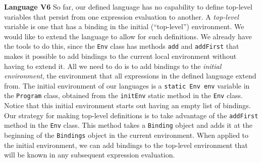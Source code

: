 \begin{minipage}[t]{\sw}
\slidenumber
\LARGE
{\bf Language V6}\exx
So far, our defined language has no capability to define top-level
variables that persist from one expression evaluation to another.
A {\em top-level} variable is one that has a binding
in the initial (``top-level'') environment.
We would like to extend the language to allow for such definitions.\exx
We already have the tools to do this,
since the \verb'Env' class has methods
\verb'add' and \verb'addFirst' that makes it 
possible to add bindings to the current local environment
without having to extend it.
All we need to do is to add bindings
to the {\em initial environment},
the environment that all expressions
in the defined language extend from.\exx
The initial environment of our languages
is a \verb'static Env env' variable
in the \verb'Program' class,
obtained from the \verb'initEnv' static method
in the \verb'Env' class.
Notice that this initial environment starts out having
an empty list of bindings.
Our strategy for making top-level definitions is
to take advantage of the \verb'addFirst' method in the \verb'Env' class.
This method takes a \verb'Binding' object and adds it
at the beginning of the \verb'Bindings' object in the current environment.
When applied to the initial environment,
we can add bindings to the top-level environment that will be known
in any subsequent expression evaluation.
\end{minipage}
